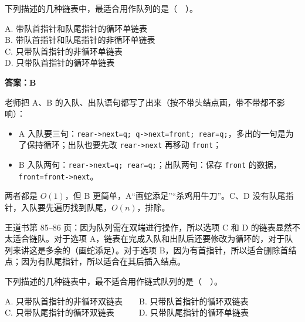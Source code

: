 \documentclass[10.5pt,a4paper,oneside]{article}
\newcommand{\hlred}[1]{\textcolor{wdred}{\bfseries #1}}
\providecommand{\tightlist}{\setlength{\itemsep}{2pt}\setlength{\parskip}{0pt}}
\begin{document}
\begin{questionbox}[12]

下列描述的几种链表中，最适合用作队列的是（　）。

A. 带队首指针和队尾指针的循环单链表\\
B. 带队首指针和队尾指针的非循环单链表\\
C. 只带队首指针的非循环单链表\\
D. 只带队首指针的循环单链表

\end{questionbox}

\hlred{\textbf{答案：B}}

\begin{videobox}

老师把 A、B
的入队、出队语句都写了出来（按不带头结点画，带不带都不影响）：

\begin{itemize}
\tightlist
\item
  A
  入队要三句：\texttt{rear-\textgreater{}next=q;\ q-\textgreater{}next=front;\ rear=q;}，多出的一句是为了保持循环；出队也要先改
  \texttt{rear-\textgreater{}next} 再移动 \texttt{front}；
\item
  B
  入队两句：\texttt{rear-\textgreater{}next=q;\ rear=q;}；出队两句：保存
  \texttt{front} 的数据，\texttt{front=front-\textgreater{}next}。
\end{itemize}

两者都是 \(O(1)\)，但 B 更简单，A“画蛇添足”“杀鸡用牛刀”。C、D
没有队尾指针，入队要先遍历找到队尾，\(O(n)\)，排除。

\end{videobox}

\begin{jiexibox}

王道书第 85--86 页：因为队列需在双端进行操作，所以选项 C 和 D
的链表显然不太适合链队。对于选项
A，链表在完成入队和出队后还要修改为循环的，对于队列来讲这是多余的（画蛇添足）。对于选项
B，因为有首指针，所以适合删除首结点；因为有队尾指针，所以适合在其后插入结点。

\end{jiexibox}

\begin{questionbox}[13]

下列描述的几种链表中，最不适合用作链式队列的是（　）。

A. 只带队首指针的非循环双链表　　B. 只带队首指针的循环双链表\\
C. 只带队尾指针的循环双链表　　　D. 只带队尾指针的循环单链表

\end{questionbox}
\end{document}
